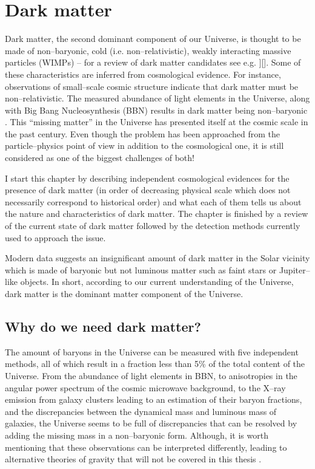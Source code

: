 \documentclass[a4wide,12pt]{book}
\begin{document}
\tableofcontents

\thispagestyle{empty}

\chapter{Dark matter}
Dark matter, the second dominant component of our Universe, is thought to be made of non--baryonic, cold (i.e. non--relativistic), weakly interacting massive particles (WIMPs) -- for a review of dark matter candidates see e.g. \citet{Bergstrom2013, DelPopolo2014}][]{}. Some of these characteristics are inferred from cosmological evidence. For instance, observations of small--scale cosmic structure indicate that dark matter must be non--relativistic.  The measured abundance of light elements in the Universe, along with Big Bang Nucleosynthesis (BBN) results in dark matter being non--baryonic \citep[see e.g. \citet{TASI2014}][for a more detailed discussion]{}. This ``missing matter'' in the Universe has presented itself at the cosmic scale in the past century. Even though the problem has been approached from the particle--physics point of view in addition to the cosmological one, it is still considered as one of the biggest challenges of both!

I start this chapter by describing independent cosmological evidences for the presence of dark matter (in order of decreasing physical scale which does not necessarily correspond to historical order) and what each of them tells us about the nature and characteristics of dark matter. The chapter is finished by a review of the current state of dark matter followed by the detection methods currently used to approach the issue.

Modern data suggests an insignificant amount of dark matter in the Solar vicinity which is made of baryonic but not luminous matter such as faint stars or Jupiter--like objects. In short, according to our current understanding of the Universe, dark matter is the dominant matter component of the Universe.

\section{Why do we need dark matter?}
The amount of baryons in the Universe can be measured with five independent methods, all of which result in a fraction less than 5\% of the total content of the Universe. From the abundance of light elements in BBN, to anisotropies in the angular power spectrum of the cosmic microwave background, to the X--ray emission from galaxy clusters leading to an estimation of their baryon fractions, and the discrepancies between the dynamical mass and luminous mass of galaxies, the Universe seems to be full of discrepancies that can be resolved by adding the missing mass in a non--baryonic form. Although, it is worth mentioning that these observations can be interpreted differently, leading to alternative theories of gravity that will not be covered in this thesis \citep[but see e.g. ][]{Clifton2006, Clifton+2012, Bloomfield2013}.
\end{document}
